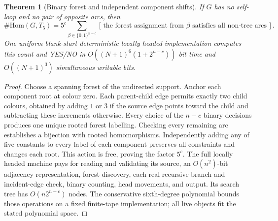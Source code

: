 \documentclass[11pt]{article}
\newtheorem{theorem}{Theorem}
\begin{document}
\begin{theorem}[Binary forest and independent component shifts]
If $G$ has no self-loop and no pair of opposite arcs, then
\[
 \#\mathrm{Hom}(G,T_5)
 =5^c\sum_{\beta\in\{0,1\}^{n-c}}
 [\,\text{the forest assignment from }\beta
       \text{ satisfies all non-tree arcs}\,].
\]
One uniform blank-start deterministic locally headed implementation
computes this count and YES/NO in
$O((N+1)^6(1+2^{n-c}))$ bit time and
$O((N+1)^3)$ simultaneous writable bits.
\end{theorem}
\begin{proof}
Choose a spanning forest of the undirected support. Anchor each
component root at colour zero. Each parent-child edge permits
exactly two child colours, obtained by adding $1$ or $3$ if the
source edge points toward the child and subtracting these increments
otherwise. Every choice of the $n-c$ binary decisions produces one
unique rooted forest labelling. Checking every remaining arc
establishes a bijection with rooted homomorphisms. Independently
adding any of five constants to every label of each component
preserves all constraints and changes each root. This action is
free, proving the factor $5^c$. The full locally headed machine
pays for reading and validating its source, an $O(n^2)$-bit
adjacency representation, forest discovery, each real recursive
branch and incident-edge check, binary counting, head movements,
and output. Its search tree has $O(n2^{n-c})$ nodes.
The conservative sixth-degree polynomial bounds those operations
on a fixed finite-tape implementation; all live objects fit the
stated polynomial space.
\end{proof}
\end{document}
